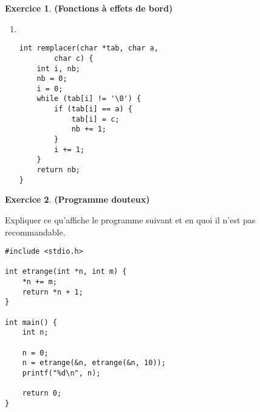 \documentclass[12pt]{article}
\theoremstyle{definition}
\newtheorem{Exercice}{Exercice}
\begin{document}
\begin{Exercice} {\bf (Fonctions à effets de bord)}
\begin{enumerate}
\begin{multicols}{2}
\begin{enumerate}
            \item ~
\begin{lstlisting}
int remplacer(char *tab, char a,
        char c) {
    int i, nb;
    nb = 0;
    i = 0;
    while (tab[i] != '\0') {
        if (tab[i] == a) {
            tab[i] = c;
            nb += 1;
        }
        i += 1;
    }
    return nb;
}
\end{lstlisting}
        \end{enumerate}
    \end{multicols}
\end{enumerate}
\end{Exercice}
\bigskip

\begin{Exercice} {\bf (Programme douteux)}\smallskip

Expliquer ce qu'affiche le programme suivant et en quoi il n'est pas
recommandable.
\begin{lstlisting}
#include <stdio.h>

int etrange(int *n, int m) {
    *n += m;
    return *n + 1;
}

int main() {
    int n;

    n = 0;
    n = etrange(&n, etrange(&n, 10));
    printf("%d\n", n);

    return 0;
}
\end{lstlisting}
\end{Exercice}
\bigskip
\end{document}
